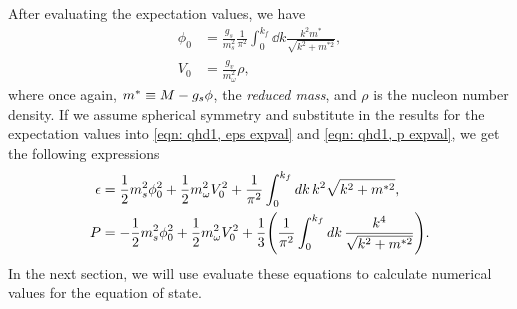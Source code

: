 After evaluating the expectation values, we have
\begin{align}
    \phi_0 &= \frac{g_s}{m_s^2} \frac{1}{\pi^2}\int_0^{k_f} \dd{k} \frac{k^2 m^*}{\sqrt{k^2 + m^{*2}}}, \label{eqn: rmf,phi0} \\
    V_0 &= \frac{g_v}{m_\omega^2} \rho, \label{eqn: rmf,V0}
\end{align}
where once again, $m^* \equiv M - g_s \phi$, the \emph{reduced mass}, and $\rho$ is the nucleon number density. If we assume spherical symmetry and substitute in the results for the expectation values into \eqref{eqn: qhd1, eps expval} and \eqref{eqn: qhd1, p expval}, we get the following expressions
\begin{align}
    \epsilon & = \frac{1}{2} m_s^2 \phi_0^2 + \frac{1}{2} m_\omega^2 V_0^2 + \frac{1}{\pi^2} \int_0^{k_f} \dd{k} k^2 \sqrt{k^2 + m^{*2}}, \label{eqn: rmf,eps}\\
    P & = -\frac{1}{2} m_s^2 \phi_0^2 + \frac{1}{2} m_\omega^2 V_0^2 + \frac{1}{3} \pqty{\frac{1}{\pi^2} \int_0^{k_f} \dd{k}\frac{k^4}{\sqrt{k^2 + m^{*2}}}}. \label{eqn: rmf,p}
\end{align}
In the next section, we will use evaluate these equations to calculate numerical values for the equation of state.




